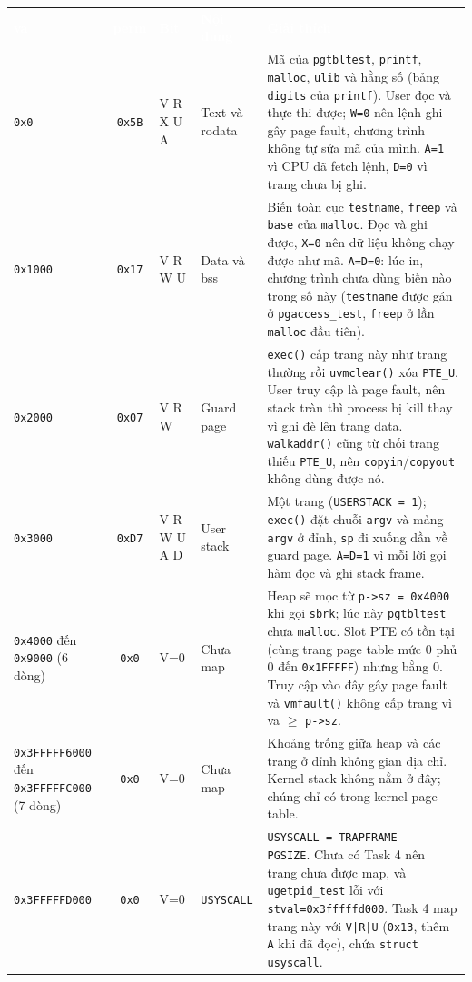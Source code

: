\documentclass[10pt,a4paper]{article}
\newcommand{\cc}[1]{\texttt{#1}}
\newcommand{\thd}[1]{\textcolor{white}{\textbf{#1}}}
\newcommand{\headrow}{\rowcolor{hcmus}}
\begin{document}
\begin{table}[H]
\centering\footnotesize
\begin{tabularx}{\linewidth}{@{}>{\raggedright\arraybackslash}p{2.35cm} c >{\raggedright\arraybackslash}p{1.6cm} >{\raggedright\arraybackslash}p{2.3cm} >{\raggedright\arraybackslash}X@{}}
\headrow \thd{va} & \thd{perm} & \thd{Bit} & \thd{Nội dung} & \thd{Giải thích} \\
\cc{0x0} & \cc{0x5B} & V R X U A & Text và rodata & Mã của \cc{pgtbltest}, \cc{printf}, \cc{malloc}, \cc{ulib} và hằng số (bảng \cc{digits} của \cc{printf}). User đọc và thực thi được; \cc{W=0} nên lệnh ghi gây page fault, chương trình không tự sửa mã của mình. \cc{A=1} vì CPU đã fetch lệnh, \cc{D=0} vì trang chưa bị ghi. \\
\rowcolor{rowalt}
\cc{0x1000} & \cc{0x17} & V R W U & Data và bss & Biến toàn cục \cc{testname}, \cc{freep} và \cc{base} của \cc{malloc}. Đọc và ghi được, \cc{X=0} nên dữ liệu không chạy được như mã. \cc{A=D=0}: lúc in, chương trình chưa dùng biến nào trong số này (\cc{testname} được gán ở \cc{pgaccess\_test}, \cc{freep} ở lần \cc{malloc} đầu tiên). \\
\cc{0x2000} & \cc{0x07} & V R W & Guard page & \cc{exec()} cấp trang này như trang thường rồi \cc{uvmclear()} xóa \cc{PTE\_U}. User truy cập là page fault, nên stack tràn thì process bị kill thay vì ghi đè lên trang data. \cc{walkaddr()} cũng từ chối trang thiếu \cc{PTE\_U}, nên \cc{copyin}/\cc{copyout} không dùng được nó. \\
\rowcolor{rowalt}
\cc{0x3000} & \cc{0xD7} & V R W U A D & User stack & Một trang (\cc{USERSTACK = 1}); \cc{exec()} đặt chuỗi \cc{argv} và mảng \cc{argv} ở đỉnh, \cc{sp} đi xuống dần về guard page. \cc{A=D=1} vì mỗi lời gọi hàm đọc và ghi stack frame. \\
\cc{0x4000} đến \cc{0x9000} (6 dòng) & \cc{0x0} & V=0 & Chưa map & Heap sẽ mọc từ \cc{p->sz = 0x4000} khi gọi \cc{sbrk}; lúc này \cc{pgtbltest} chưa \cc{malloc}. Slot PTE có tồn tại (cùng trang page table mức 0 phủ 0 đến \cc{0x1FFFFF}) nhưng bằng 0. Truy cập vào đây gây page fault và \cc{vmfault()} không cấp trang vì va $\ge$ \cc{p->sz}. \\
\rowcolor{rowalt}
\cc{0x3FFFFF6000} đến \cc{0x3FFFFFC000} (7 dòng) & \cc{0x0} & V=0 & Chưa map & Khoảng trống giữa heap và các trang ở đỉnh không gian địa chỉ. Kernel stack không nằm ở đây; chúng chỉ có trong kernel page table. \\
\cc{0x3FFFFFD000} & \cc{0x0} & V=0 & \cc{USYSCALL} & \cc{USYSCALL = TRAPFRAME - PGSIZE}. Chưa có Task 4 nên trang chưa được map, và \cc{ugetpid\_test} lỗi với \cc{stval=0x3fffffd000}. Task 4 map trang này với \cc{V|R|U} (\cc{0x13}, thêm \cc{A} khi đã đọc), chứa \cc{struct usyscall}. \\

\end{tabularx}
\end{table}
\end{document}
